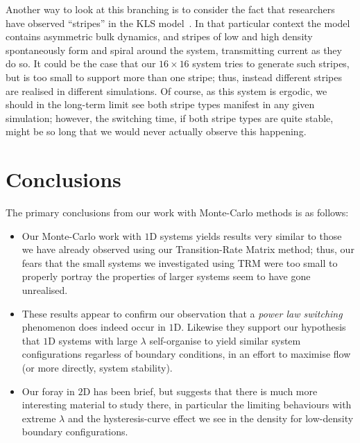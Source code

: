 Another way to look at this branching is to consider the fact that researchers have observed 
``stripes'' in the KLS model~\cite{Zia2010}. In that particular context the model contains asymmetric
bulk dynamics, and stripes of low and high density spontaneously form and spiral around the 
system, transmitting current as they do so. It could be the case that our $16 \times 16$ system
tries to generate such stripes, but is too small to support more than one stripe; thus, instead
different stripes are realised in different simulations. Of course, as this system is ergodic, we
should in the long-term limit see both stripe types manifest in any given simulation; however,
the switching time, if both stripe types are quite stable, might be so long that we would never
actually observe this happening.

\section{Conclusions}
The primary conclusions from our work with Monte-Carlo methods is as follows:
\begin{itemize}
 \item Our Monte-Carlo work with $1$D systems yields results very similar to those we 
 have already observed using our Transition-Rate Matrix method; thus, our fears that the small
 systems we investigated using TRM were too small to properly portray the properties of larger
 systems seem to have gone unrealised.
 \item These results appear to confirm our observation that a \textit{power law 
 switching} phenomenon does indeed occur in $1$D. Likewise they support our hypothesis that
 $1$D systems with large $\lambda$ self-organise to yield similar system configurations
 regarless of boundary conditions, in an effort to maximise flow (or more directly, system
 stability).
 \item Our foray in $2$D has been brief, but suggests that there is much more interesting material to study there, in particular the limiting behaviours with extreme $\lambda$
 and the hysteresis-curve effect we see in the density for low-density boundary configurations.
\end{itemize}




